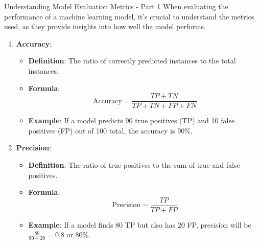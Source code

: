 \documentclass[aspectratio=169]{beamer}
\begin{document}
\begin{frame}[fragile]{Understanding Model Evaluation Metrics - Part 1}
    When evaluating the performance of a machine learning model, it’s crucial to understand the metrics used, as they provide insights into how well the model performs.

    \begin{enumerate}
        \item \textbf{Accuracy}:
            \begin{itemize}
                \item \textbf{Definition}: The ratio of correctly predicted instances to the total instances.
                \item \textbf{Formula}:
                \begin{equation}
                    \text{Accuracy} = \frac{TP + TN}{TP + TN + FP + FN}
                \end{equation}
                \item \textbf{Example}: If a model predicts 90 true positives (TP) and 10 false positives (FP) out of 100 total, the accuracy is 90\%.
            \end{itemize}
        
        \item \textbf{Precision}:
            \begin{itemize}
                \item \textbf{Definition}: The ratio of true positives to the sum of true and false positives.
                \item \textbf{Formula}:
                \begin{equation}
                    \text{Precision} = \frac{TP}{TP + FP}
                \end{equation}
                \item \textbf{Example}: If a model finds 80 TP but also has 20 FP, precision will be \( \frac{80}{80 + 20} = 0.8 \) or 80\%.
            \end{itemize}
    \end{enumerate}
\end{frame}
\end{document}
